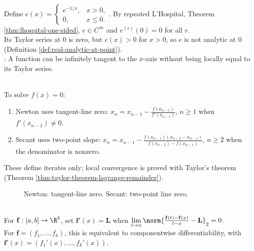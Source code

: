 \begin{example} \label{ex:smooth-flat-nonanalytic-function} \\
Define $e(x)=
\begin{cases}
e^{-1/x},&x>0,\\
0,&x\leq0.
\end{cases}$.
By repeated L'Hospital, Theorem \ref{thm:lhospital-one-sided}, $e\in C^\infty$ and $e^{(r)}(0)=0$ for all $r$.\\
Its Taylor series at $0$ is zero, but $e(x)>0$ for $x>0$, so $e$ is not analytic at $0$ (Definition \ref{def:real-analytic-at-point}).\\
: A function can be infinitely tangent to the $x$-axis without being locally equal to its Taylor series.
\end{example}

\begin{method} \label{meth:newton-and-secant-iterations} \\
To solve $f(x)=0$:
\begin{enumerate}[label=(\roman*)]
\setlength{\itemsep}{0pt}
\item
Newton uses tangent-line zero: $x_n=x_{n-1}-\frac{f(x_{n-1})}{f'(x_{n-1})}$, $n\geq1$ when $f'(x_{n-1})\neq0$.
\item
Secant uses two-point slope: $x_n=x_{n-1}-\frac{f(x_{n-1})(x_{n-2}-x_{n-1})}{f(x_{n-2})-f(x_{n-1})}$, $n\geq2$ when the denominator is nonzero.
\end{enumerate}
These define iterates only; local convergence is proved with Taylor's theorem (Theorem \ref{thm:taylor-theorem-lagrange-remainder}).
\end{method}

\begin{figure}[H]
  \centering
  
  \caption{\textcolor{green!45!black}{Newton}: tangent-line zero. \textcolor{orange!85!black}{Secant}: two-point line zero.}
  \label{fig:newton-secant-iterations}
\end{figure}

\begin{definition} \label{def:vector-valued-derivative-one-variable} \\
For $\mathbf{f}:[a,b]\to\R^k$, set $\mathbf{f}'(x)=\mathbf{L}$ when $\lim\limits_{t\to x}\norm{\frac{\mathbf{f}(t)-\mathbf{f}(x)}{t-x}-\mathbf{L}}_2=0$.\\
For $\mathbf{f}=(f_1,\ldots,f_k)$, this is equivalent to componentwise differentiability, with $\mathbf{f}'(x)=(f_1'(x),\ldots,f_k'(x))$.
\end{definition}

